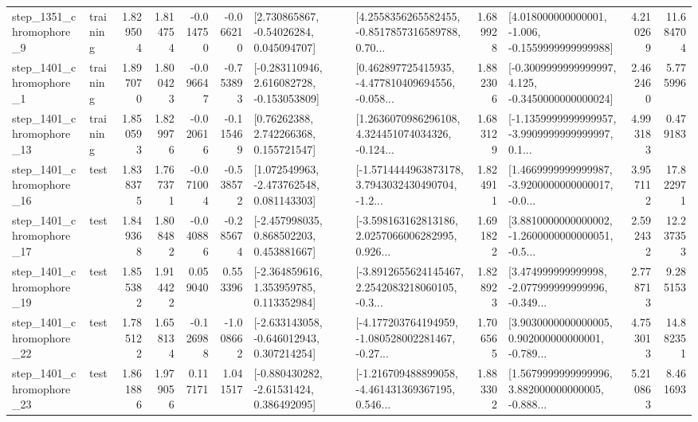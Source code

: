 \begin{tabular}{llrrrrllrlrr}
  step\_1351\_chromophore\_9 &  training &      1.829504 &    1.814754 &     -0.014750 & -0.066210 &     [2.730865867, -0.54026284, 0.045094707] &  [4.2558356265582455, -0.8517857316589788, 0.70... &       1.689928 &   [4.018000000000001, -1.006, -0.1559999999999988] &            4.210269 &         11.684704 \\
  step\_1401\_chromophore\_1 &  training &      1.897070 &    1.800423 &     -0.096647 & -0.753893 &   [-0.283110946, 2.616082728, -0.153053809] &  [0.462897725415935, -4.477810409694556, -0.058... &       1.882306 &  [-0.3009999999999997, 4.125, -0.3450000000000024] &            2.462460 &          5.775996 \\
 step\_1401\_chromophore\_13 &  training &      1.850593 &    1.829976 &     -0.020616 & -0.115469 &      [0.76262388, 2.742266368, 0.155721547] &  [1.2636070986296108, 4.324451074034326, -0.124... &       1.683129 &  [-1.1359999999999957, -3.9909999999999997, 0.1... &            4.993183 &          0.479183 \\
 step\_1401\_chromophore\_16 &      test &      1.838375 &    1.767371 &     -0.071004 & -0.538572 &    [1.072549963, -2.473762548, 0.081143303] &  [-1.5714444963873178, 3.7943032430490704, -1.2... &       1.824911 &  [1.4669999999999987, -3.9200000000000017, -0.0... &            3.957112 &         17.822971 \\
 step\_1401\_chromophore\_17 &      test &      1.849368 &    1.808482 &     -0.040886 & -0.285674 &    [-2.457998035, 0.868502203, 0.453881667] &  [-3.598163162813186, 2.0257066006282995, 0.926... &       1.691822 &  [3.8810000000000002, -1.2600000000000051, -0.5... &            2.592432 &         12.237353 \\
 step\_1401\_chromophore\_19 &      test &      1.855382 &    1.914422 &      0.059040 &  0.553396 &    [-2.364859616, 1.353959785, 0.113352984] &  [-3.8912655624145467, 2.2542083218060105, -0.3... &       1.828923 &  [3.474999999999998, -2.077999999999996, -0.349... &            2.778713 &          9.285153 \\
 step\_1401\_chromophore\_22 &      test &      1.785122 &    1.658134 &     -0.126988 & -1.008662 &   [-2.633143058, -0.646012943, 0.307214254] &  [-4.177203764194959, -1.080528002281467, -0.27... &       1.706565 &  [3.9030000000000005, 0.902000000000001, -0.789... &            4.753013 &         14.882351 \\
 step\_1401\_chromophore\_23 &      test &      1.861886 &    1.979056 &      0.117171 &  1.041517 &    [-0.880430282, -2.61531424, 0.386492095] &  [-1.216709488899058, -4.461431369367195, 0.546... &       1.883302 &  [1.5679999999999996, 3.882000000000005, -0.888... &            5.210863 &          8.461693 \\

\end{tabular}
